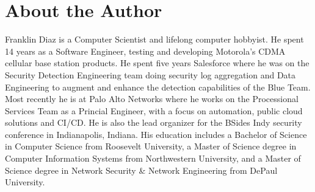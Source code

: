 \chapter*{About the Author}
\vspace{5mm}

\justify
Franklin Diaz is a Computer Scientist and lifelong computer hobbyist. He spent
14 years as a Software Engineer, testing and developing Motorola's CDMA
cellular base station products. He spent five years Salesforce where he was on 
the Security Detection Engineering team doing security log aggregation and Data
Engineering to augment and enhance the detection capabilities of the Blue Team. 
Most recently he is at Palo Alto Networks where he works on the Processional Services Team
as a Princial Engineer, with a focus on automation, public cloud solutions and CI/CD. 
He is also the lead organizer for the BSides Indy security conference in Indianapolis, 
Indiana. His education includes a Bachelor of Science in Computer Science from Roosevelt 
University, a Master of Science degree in Computer Information Systems from Northwestern 
University, and a Master of Science degree in Network Security \& Network Engineering 
from DePaul University.
\vspace{5mm}
